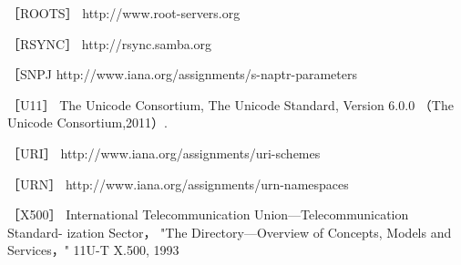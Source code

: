 ［ROOTS］ http://www.root-servers.org

［RSYNC］ http://rsync.samba.org

［SNPJ http://www.iana.org/assignments/s-naptr-parameters

［U11］ The Unicode Consortium, The Unicode Standard, Version 6.0.0 （The Unicode
Consortium,2011）.

［URI］ http://www.iana.org/assignments/uri-schemes

［URN］ http://www.iana.org/assignments/urn-namespaces

［X500］ International Telecommunication Union—Telecommunication Standard-
ization Sector， "The Directory—Overview of Concepts, Models and Services，"
11U-T X.500, 1993